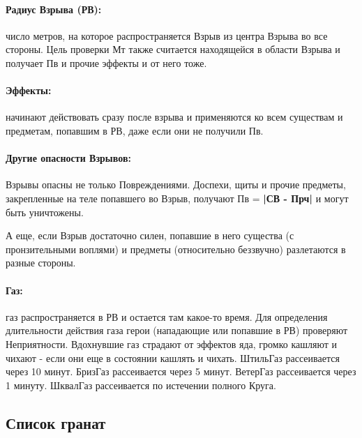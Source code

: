 \paragraph{Радиус Взрыва (РВ):} число метров, на которое распространяется Взрыв из центра Взрыва во все стороны. Цель проверки Мт также считается находящейся в области Взрыва и получает Пв и прочие эффекты и от него тоже.
\paragraph{Эффекты:} начинают действовать сразу после взрыва и применяются ко всем существам и предметам, попавшим в РВ, даже если они не получили Пв. 
\paragraph{Другие опасности Взрывов:} Взрывы опасны не только Повреждениями. Доспехи, щиты и прочие предметы, закрепленные на теле попавшего во Взрыв, получают Пв = \textbf{|СВ - Прч|} и могут быть уничтожены. 
\begin{tcolorbox}
    А еще, если Взрыв достаточно силен, попавшие в него существа (с пронзительными воплями) и предметы (относительно беззвучно) разлетаются в разные стороны. 
\end{tcolorbox}

\paragraph{Газ:} газ распространяется в РВ и остается там какое-то время. Для определения длительности действия газа герои (нападающие или попавшие в РВ) проверяют Неприятности. Вдохнувшие газ страдают от эффектов яда, громко кашляют и чихают - если они еще в состоянии кашлять и чихать. 
\trouble
{Штиль}{Газ рассеивается через 10 минут.}
{Бриз}{Газ рассеивается через 5 минут.}
{Ветер}{Газ рассеивается через 1 минуту.}
{Шквал}{Газ рассеивается по истечении полного Круга.}
\tbd

\subsection{Список гранат}
